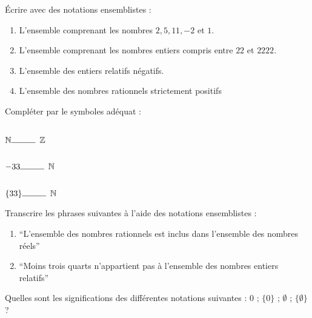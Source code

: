 \documentclass[a4paper,12pt]{article}
\begin{document}
\begin{activite}
	\tcblower
	\begin{tasks}
\task Écrire avec des notations ensemblistes :
\begin{enumerate}
\item L'ensemble comprenant les nombres $2, 5, 11, -2$ et $1$.
\item L'ensemble comprenant les nombres entiers compris entre $22$ et $2222$.
\item L'ensemble des entiers relatifs négatifs.
\item L'ensemble des nombres rationnels strictement positifs
\end{enumerate}

\task Compléter par le symboles adéquat :

	\begin{inlineumerate}
	\item $\mathbb{N} \ligne{1} \mathbb{Z}$\hspace{2cm}
	\item $-33 \ligne{1} \mathbb{N}$\hspace{2cm}
	\item $\{33\} \ligne{1} \mathbb{N}$\hspace{2cm}
\end{inlineumerate}

\task Transcrire les phrases suivantes à l'aide des notations ensemblistes :
\begin{enumerate}
\item \enquote{L'ensemble des nombres rationnels est inclus dans l'ensemble des nombres réels}
\item \enquote{Moins trois quarts n'appartient pas à l'ensemble des nombres entiers relatifs}
\end{enumerate}

\task Quelles sont les significations des différentes notations suivantes : $0$ ; $\{0\}$ ; $\emptyset$ ; $\{\emptyset\}$ ?
\end{tasks}
\end{activite}
\end{document}
